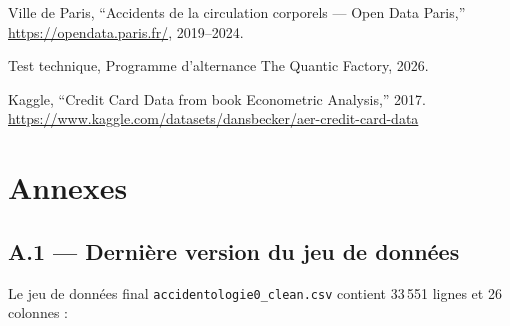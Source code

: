 \documentclass[12pt,a4paper]{article}
\begin{document}
\begin{enumerate}[label={[\arabic*]}]
  \item Ville de Paris, ``Accidents de la circulation corporels --- Open
        Data Paris,'' \url{https://opendata.paris.fr/}, 2019--2024.
  \item Test technique, Programme d'alternance The Quantic Factory, 2026.
  \item Kaggle, ``Credit Card Data from book Econometric Analysis,'' 2017.
        \url{https://www.kaggle.com/datasets/dansbecker/aer-credit-card-data}
\end{enumerate}


\newpage
\appendix
\section{Annexes}

\subsection{A.1 --- Dernière version du jeu de données}

Le jeu de données final \texttt{accidentologie0\_clean.csv} contient
33\,551 lignes et 26 colonnes :
\end{document}
